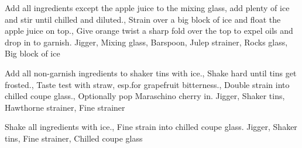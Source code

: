 \documentclass[../main.tex]{subfiles}
\begin{document}

    {
            {Add all ingredients except the apple juice to the mixing glass, add plenty of ice and stir until chilled and diluted.},
            {Strain over a big block of ice and float the apple juice on top.},
            {Give orange twist a sharp fold over the top to expel oils and drop in to garnish.}
    }
    {Jigger, Mixing glass, Barspoon, Julep strainer, Rocks glass, Big block of ice}

    \cocktailDivider

    {
            {Add all non-garnish ingredients to shaker tins with ice.},
            {Shake hard until tins get frosted.},
            {Taste test with straw, esp.\@ for grapefruit bitterness.},
            {Double strain into chilled coupe glass.},
        Optionally pop Maraschino cherry in.
    }
    {Jigger, Shaker tins, Hawthorne strainer, Fine strainer}

    \cocktailDivider

    {
            {Shake all ingredients with ice.},
            {Fine strain into chilled coupe glass.}
    }
    {Jigger, Shaker tins, Fine strainer, Chilled coupe glass}


\end{document}
